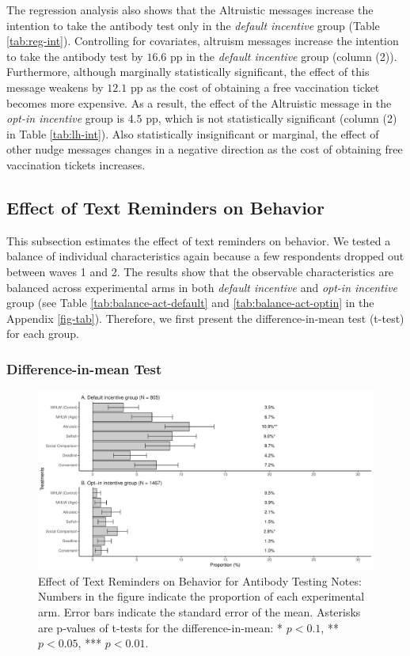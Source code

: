 \documentclass[
]{article}
\begin{document}
The regression analysis also shows that the Altruistic messages increase the intention to take the antibody test only in the \emph{default incentive} group (Table \ref{tab:reg-int}). Controlling for covariates, altruism messages increase the intention to take the antibody test by \(16.6\) pp in the \emph{default incentive} group (column (2)). Furthermore, although marginally statistically significant, the effect of this message weakens by \(12.1\) pp as the cost of obtaining a free vaccination ticket becomes more expensive. As a result, the effect of the Altruistic message in the \emph{opt-in incentive} group is \(4.5\) pp, which is not statistically significant (column (2) in Table \ref{tab:lh-int}). Also statistically insignificant or marginal, the effect of other nudge messages changes in a negative direction as the cost of obtaining free vaccination tickets increases.

\hypertarget{behavior}{%
\subsection{Effect of Text Reminders on Behavior}\label{behavior}}

This subsection estimates the effect of text reminders on behavior. We tested a balance of individual characteristics again because a few respondents dropped out between waves 1 and 2. The results show that the observable characteristics are balanced across experimental arms in both \emph{default incentive} and \emph{opt-in incentive} group (see Table \ref{tab:balance-act-default} and \ref{tab:balance-act-optin} in the Appendix \ref{fig-tab}). Therefore, we first present the difference-in-mean test (t-test) for each group.

\hypertarget{difference-in-mean-test-1}{%
\subsubsection{Difference-in-mean Test}\label{difference-in-mean-test-1}}

\begin{figure}[t]
\includegraphics{discussion-paper_files/figure-latex/ttest-act-test-1} \caption{Effect of Text Reminders on Behavior for Antibody Testing Notes: Numbers in the figure indicate the proportion of each experimental arm. Error bars indicate the standard error of the mean. Asterisks are p-values of t-tests for the difference-in-mean: * $p < 0.1$, ** $p < 0.05$, *** $p < 0.01$.}\label{fig:ttest-act-test}
\end{figure}
\end{document}
